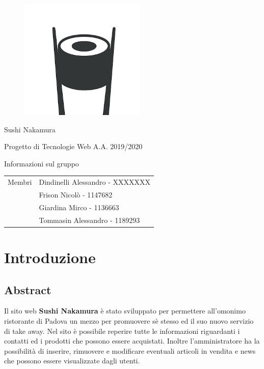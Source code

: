 \documentclass{article}
\begin{document}
	\begin{titlepage}
		\begin{figure}[http]
			\centering
			\includegraphics[width=6cm]{logo.jpg}
		\end{figure}
	
		\vspace*{2cm}
		
		{\huge\bfseries\centerline{Sushi Nakamura} }
		\centerline{Progetto di Tecnologie Web A.A. 2019/2020}
		
		\vspace*{1cm}
		{\bfseries \centerline{Informazioni sul gruppo}}
		\begin{center}
			\begin{tabular}{ c|l } 
				Membri & Dindinelli Alessandro - XXXXXXX\\ 
				& Frison Nicolò - 1147682\\ 
				& Giardina Mirco - 1136663\\
				& Tommasin Alessandro - 1189293\\ 
			\end{tabular}
		\end{center}
		
		\vspace*{\fill}
		
	\end{titlepage}
	
	\clearpage
	\renewcommand*\contentsname{Indice}
	\tableofcontents	
	\newpage
	
	\section{Introduzione}
		\subsection{Abstract}
			Il sito web \textbf{Sushi Nakamura} è stato sviluppato per permettere all'omonimo ristorante di Padova un mezzo per promuovere sè stesso ed il suo nuovo servizio di take away.
			Nel sito è possibile reperire tutte le informazioni riguardanti i contatti ed i prodotti che possono essere acquistati.
			Inoltre l'amministratore ha la possibilità di inserire, rimuovere e modificare eventuali articoli in vendita e news che possono essere visualizzate dagli utenti.
\end{document}
